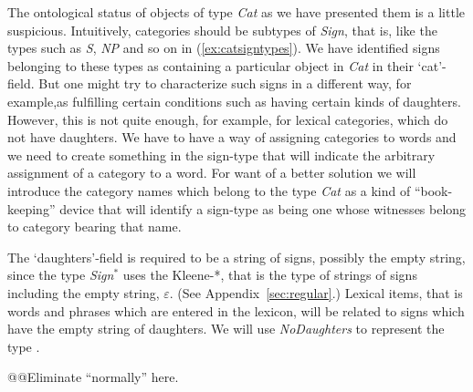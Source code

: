 The ontological status of objects of type \textit{Cat} as we have
presented them is a little suspicious.  Intuitively, categories should
be subtypes of \textit{Sign}, that is, like the types such as \textit{S},
\textit{NP} and so on in (\ref{ex:catsigntypes}).  We have identified
signs belonging to these types as containing a particular object in
\textit{Cat} in their `cat'-field.  But one might try to characterize
such signs in a different way, for example,as fulfilling certain conditions
such as having  certain kinds of daughters.  However, this is not quite enough, for
example, for lexical categories, which do not have daughters.  We have
to have a way of assigning categories to words and we need to create
something in the sign-type that will indicate the arbitrary assignment
of a category to a word.  For want of a better solution we will
introduce the category names which belong to the type \textit{Cat}
as a kind of ``book-keeping'' device that will identify a sign-type as
being one whose witnesses belong to category bearing that name.  

The `daughters'-field is required to be a string of signs, possibly
the empty string, since the type \textit{Sign}$^*$ uses the Kleene-*,
that is the type of strings of signs including the empty string,
$\varepsilon$.  (See Appendix~\ref{sec:regular}.) Lexical items, that is words and phrases which are
entered in the lexicon, will be related to signs which have the empty
string of daughters.  We will use \textit{NoDaughters} to represent
the type
.

@@Eliminate ``normally'' here.

